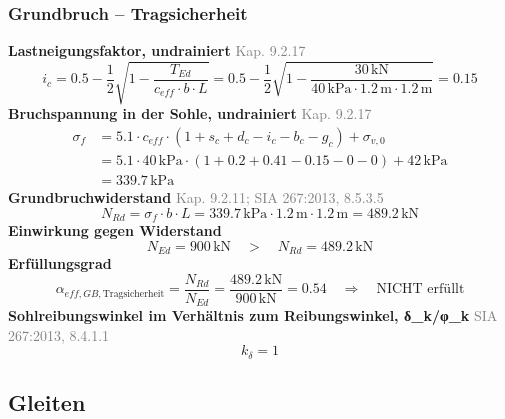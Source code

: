\documentclass[11pt,a4paper]{article}
\newcommand{\normref}[1]{{\small\textcolor{gray}{#1}}}
\begin{document}
\subsubsection{Grundbruch – Tragsicherheit}
\noindent\textbf{Lastneigungsfaktor, undrainiert} \hfill \normref{Kap. 9.2.17}
\begin{equation*}
i_c = 0.5 - \frac{1}{2} \sqrt{1 - \frac{T_{Ed}}{c_{eff} \cdot b \cdot L}} = 0.5 - \frac{1}{2} \sqrt{1 - \frac{30\,\mathrm{kN}}{40\,\mathrm{kPa} \cdot 1.2\,\mathrm{m} \cdot 1.2\,\mathrm{m}}} = 0.15
\end{equation*}
\noindent\textbf{Bruchspannung in der Sohle, undrainiert} \hfill \normref{Kap. 9.2.17}
\begin{equation*}
\begin{aligned}
  \sigma_f &= 5.1 \cdot c_{eff} \cdot \left(1 + s_c + d_c - i_c - b_c - g_c\right) + \sigma_{v,0} \\
  &= 5.1 \cdot 40\,\mathrm{kPa} \cdot \left(1 + 0.2 + 0.41 - 0.15 - 0 - 0\right) + 42\,\mathrm{kPa} \\
  &= 339.7\,\mathrm{kPa}
\end{aligned}
\end{equation*}
\noindent\textbf{Grundbruchwiderstand} \hfill \normref{Kap. 9.2.11; SIA 267:2013, 8.5.3.5}
\begin{equation*}
N_{Rd} = \sigma_f \cdot b \cdot L = 339.7\,\mathrm{kPa} \cdot 1.2\,\mathrm{m} \cdot 1.2\,\mathrm{m} = 489.2\,\mathrm{kN}
\end{equation*}
\noindent\textbf{Einwirkung gegen Widerstand}
\begin{equation*}
N_{Ed} = 900\,\mathrm{kN} \quad > \quad N_{Rd} = 489.2\,\mathrm{kN}
\end{equation*}
\noindent\textbf{Erfüllungsgrad}
\begin{equation*}
\alpha_{eff,GB,\text{Tragsicherheit}} = \frac{N_{Rd}}{N_{Ed}} = \frac{489.2\,\mathrm{kN}}{900\,\mathrm{kN}} = 0.54 \quad \Rightarrow \quad \text{NICHT erfüllt}
\end{equation*}
\noindent\textbf{Sohlreibungswinkel im Verhältnis zum Reibungswinkel, δ\_k/φ\_k} \hfill \normref{SIA 267:2013, 8.4.1.1}
\begin{equation*}
k_{\delta} = 1
\end{equation*}
\subsection{Gleiten}
\end{document}
